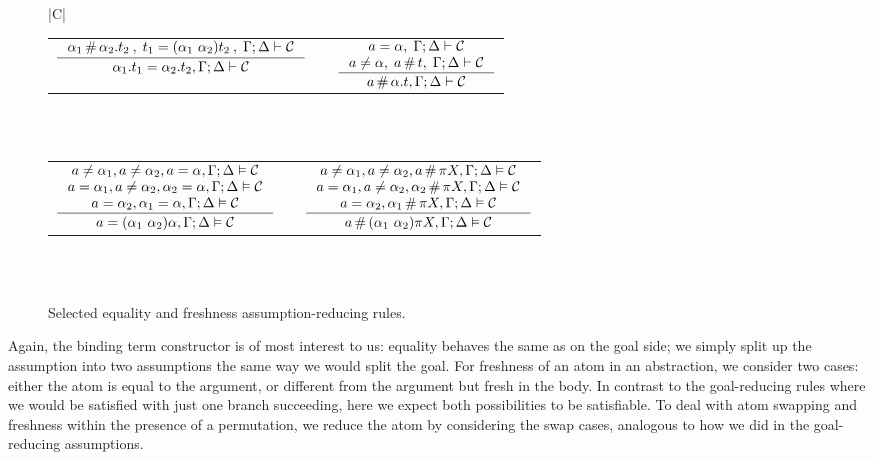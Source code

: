 \documentclass[english, mgr]{iithesis}
\newcommand{\solverRule}{\vdash}
\begin{document}
\begin{figure}[htpb]
  \centering
  \begin{tabularx}{\textwidth}{|C|}
  \hline \\
  \begin{tabular}{ccc} $
    \inference{
      \atomexp_1 \cfresh \tbind{\atomexp_2} \term_2\:,\;
        \term_1 = \permswap{\atomexp_1}{\atomexp_2}\term_2 \:, \;
        \cEnv ; \icEnv \solverRule \sconstr
    }{
      \tbind{\atomexp_1} \term_1 \ceq \tbind{\atomexp_2} \term_2 , \cEnv ; \icEnv \solverRule \sconstr
    } $ & & $
    \inference{
      \atomv \ceq \atomexp, \; \cEnv ; \icEnv \solverRule \sconstr
      \\
      \atomv \cneq \atomexp, \; \atomv \cfresh \term,\;\cEnv ; \icEnv \solverRule \sconstr
    }{
      \atomv \cfresh \tbind{\atomexp} \term , \cEnv ; \icEnv \solverRule \sconstr
    } $
  \end{tabular}
  \\ \\
  \begin{tabular}{ccc} $
    \inference{
      \atomv \cneq \atomexp_1, \atomv \cneq \atomexp_2, \atomv     \ceq \atomexp, \cEnv ; \icEnv \vDash \sconstr \\
      \atomv \ceq  \atomexp_1, \atomv \cneq \atomexp_2, \atomexp_2 \ceq \atomexp, \cEnv ; \icEnv \vDash \sconstr \\
                              \atomv \ceq  \atomexp_2, \atomexp_1 \ceq \atomexp, \cEnv ; \icEnv \vDash \sconstr
    }{
      \atomv \ceq \permswap{\atomexp_1}{\atomexp_2} \atomexp, \cEnv ; \icEnv \vDash \sconstr
    } $ & & $
    \inference{
      \atomv \cneq \atomexp_1, \atomv \cneq \atomexp_2, \atomv     \cfresh \perm\termv, \cEnv ; \icEnv \vDash \sconstr \\
      \atomv \ceq  \atomexp_1, \atomv \cneq \atomexp_2, \atomexp_2 \cfresh \perm\termv, \cEnv ; \icEnv \vDash \sconstr \\
                              \atomv \ceq  \atomexp_2, \atomexp_1 \cfresh \perm\termv, \cEnv ; \icEnv \vDash \sconstr
    }{
      \atomv \cfresh \permswap{\atomexp_1}{\atomexp_2} \perm\termv, \cEnv ; \icEnv \vDash \sconstr
    } $
  \end{tabular}
  \\ \\\hline
  \end{tabularx}
  \caption{Selected equality and freshness assumption-reducing rules.}
  \label{fig:abstraction}
\end{figure}
Again, the binding term constructor is of most interest to us:
equality behaves the same as on the goal side; we simply
split up the assumption into two assumptions the same way we would split the goal.
For freshness of an atom in an abstraction, we consider two cases:
either the atom is equal to the argument,
or different from the argument but fresh in the body.
In contrast to the goal-reducing rules where we would be satisfied with
just one branch succeeding, here we expect both possibilities to be satisfiable.
To deal with atom swapping and freshness within the presence of a permutation,
we reduce the atom by considering the swap cases, analogous to how we did in the
goal-reducing assumptions.
\end{document}
